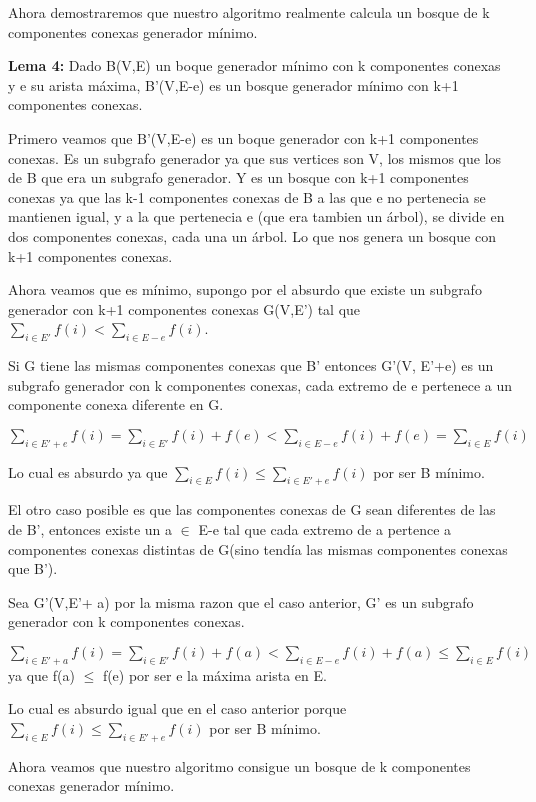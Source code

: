 Ahora demostraremos que nuestro algoritmo realmente calcula un bosque de k componentes conexas generador mínimo.

\textbf{Lema 4:} Dado B(V,E) un boque generador mínimo con k componentes conexas y e su arista máxima, B'(V,E-e) es un bosque generador mínimo con k+1 componentes conexas.

Primero veamos que B'(V,E-e) es un boque generador con k+1 componentes conexas. Es un subgrafo generador ya que sus vertices son V, los mismos que los de B que era un subgrafo generador. Y es un bosque con k+1 componentes conexas ya que las k-1 componentes conexas de B a las que e no pertenecia se mantienen igual, y a la que pertenecia e (que era tambien un árbol), se divide en dos componentes conexas, cada una un árbol. Lo que nos genera un bosque con k+1 componentes conexas.

Ahora veamos que es mínimo, supongo por el absurdo que existe un subgrafo generador con k+1 componentes conexas G(V,E') tal que $\sum_{i \in E'} f(i) < \sum_{i \in E-e} f(i)$.

Si G tiene las mismas componentes conexas que B' entonces G'(V, E'+e) es un subgrafo generador con k componentes conexas, cada extremo de e pertenece a un componente conexa diferente en G.

$\sum_{i \in E'+e} f(i) = \sum_{i \in E'} f(i) + f(e) < \sum_{i \in E-e} f(i) + f(e) = \sum_{i \in E} f(i)$

Lo cual es absurdo ya que $\sum_{i \in E} f(i) \leq \sum_{i \in E'+e} f(i)$ por ser B mínimo.

El otro caso posible es que las componentes conexas de G sean diferentes de las de B', entonces existe un a $\in$ E-e tal que cada extremo de a pertence a componentes conexas distintas de G(sino tendía las mismas componentes conexas que B').

Sea G'(V,E'+ a) por la misma razon que el caso anterior, G' es un subgrafo generador con k componentes conexas.

$\sum_{i \in E'+a} f(i) = \sum_{i \in E'} f(i) + f(a) < \sum_{i \in E-e} f(i) + f(a) \leq \sum_{i \in E} f(i)$ ya que f(a) $\leq$ f(e) por ser e la máxima arista en E.

Lo cual es absurdo igual que en el caso anterior porque $\sum_{i \in E} f(i) \leq \sum_{i \in E'+e} f(i)$ por ser B mínimo.

Ahora veamos que nuestro algoritmo consigue un bosque de k componentes conexas generador mínimo.

